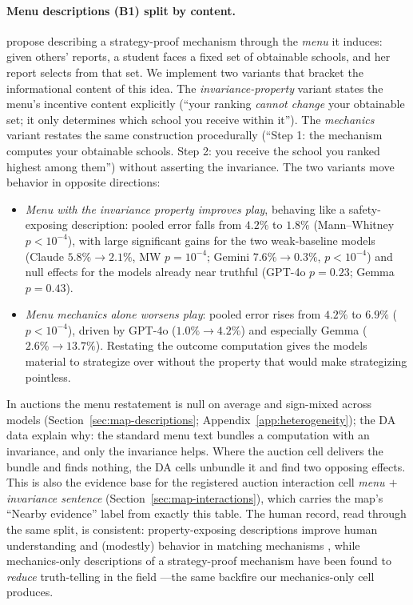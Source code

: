 \paragraph{Menu descriptions (B1) split by content.} \citet{gonczarowski2023strategyproofness} propose describing a strategy-proof mechanism through the \emph{menu} it induces: given others' reports, a student faces a fixed set of obtainable schools, and her report selects from that set. We implement two variants that bracket the informational content of this idea. The \emph{invariance-property} variant states the menu's incentive content explicitly (``your ranking \emph{cannot change} your obtainable set; it only determines which school you receive within it''). The \emph{mechanics} variant restates the same construction procedurally (``Step 1: the mechanism computes your obtainable schools. Step 2: you receive the school you ranked highest among them'') without asserting the invariance. The two variants move behavior in opposite directions:
\begin{itemize}
    \item \emph{Menu with the invariance property improves play}, behaving like a safety-exposing description: pooled error falls from $4.2\%$ to $1.8\%$ (Mann--Whitney $p < 10^{-4}$), with large significant gains for the two weak-baseline models (Claude $5.8\% \to 2.1\%$, MW $p = 10^{-4}$; Gemini $7.6\% \to 0.3\%$, $p < 10^{-4}$) and null effects for the models already near truthful (GPT-4o $p = 0.23$; Gemma $p = 0.43$).
    \item \emph{Menu mechanics alone worsens play}: pooled error rises from $4.2\%$ to $6.9\%$ ($p < 10^{-4}$), driven by GPT-4o ($1.0\% \to 4.2\%$) and especially Gemma ($2.6\% \to 13.7\%$). Restating the outcome computation gives the models material to strategize over without the property that would make strategizing pointless.
\end{itemize}
In auctions the menu restatement is null on average and sign-mixed across models (Section~\ref{sec:map-descriptions}; Appendix~\ref{app:heterogeneity}); the DA data explain why: the standard menu text bundles a computation with an invariance, and only the invariance helps. Where the auction cell delivers the bundle and finds nothing, the DA cells unbundle it and find two opposing effects. This is also the evidence base for the registered auction interaction cell \emph{menu $+$ invariance sentence} (Section~\ref{sec:map-interactions}), which carries the map's ``Nearby evidence'' label from exactly this table. The human record, read through the same split, is consistent: property-exposing descriptions improve human understanding and (modestly) behavior in matching mechanisms \citep{gonczarowski2024describing, katuscak2024simpler}, while mechanics-only descriptions of a strategy-proof mechanism have been found to \emph{reduce} truth-telling in the field \citep{guillen2018effectiveness}---the same backfire our mechanics-only cell produces.

